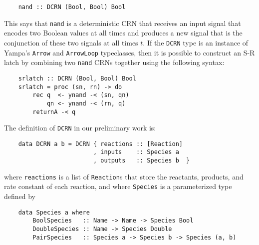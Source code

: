 \begin{lstlisting}
    nand :: DCRN (Bool, Bool) Bool
\end{lstlisting}

This says that \lstinline{nand} is a deterministic CRN that receives an input signal that encodes two Boolean values at all times and produces a new signal that is the conjunction of these two signals at all times \( t \).
If the \lstinline{DCRN} type is an instance of Yampa's \lstinline{Arrow} and \lstinline{ArrowLoop} typeclasses, then it is possible to construct an S-R latch by combining two \lstinline{nand} CRNs together using the following syntax:

\begin{lstlisting}
    srlatch :: DCRN (Bool, Bool) Bool
    srlatch = proc (sn, rn) -> do
        rec q  <- ynand -< (sn, qn)
            qn <- ynand -< (rn, q)
        returnA -< q
\end{lstlisting}

The definition of \lstinline!DCRN! in our preliminary work is:
\begin{lstlisting}
    data DCRN a b = DCRN { reactions :: [Reaction]
                         , inputs    :: Species a
                         , outputs   :: Species b  }
\end{lstlisting}
where \lstinline!reactions! is a list of \lstinline!Reaction!s that store the reactants, products, and rate constant of each reaction, and where \lstinline!Species! is a parameterized type defined by
\begin{lstlisting}
    data Species a where
        BoolSpecies   :: Name -> Name -> Species Bool
        DoubleSpecies :: Name -> Species Double
        PairSpecies   :: Species a -> Species b -> Species (a, b)
\end{lstlisting}


